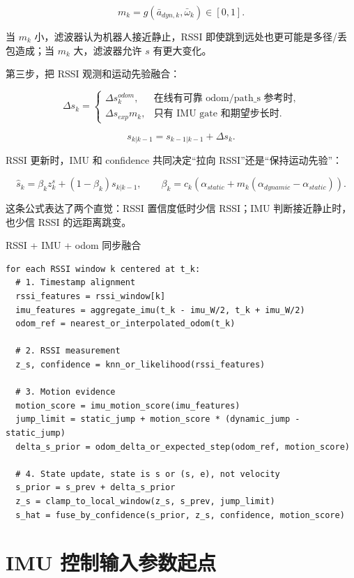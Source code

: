 \documentclass[11pt,a4paper,openany]{report}
\begin{document}
\[
  m_k = g(\bar{a}_{dyn,k}, \bar{\omega}_k) \in [0,1].
\]

当 \(m_k\) 小，滤波器认为机器人接近静止，RSSI 即使跳到远处也更可能是多径/丢包造成；当 \(m_k\) 大，滤波器允许 \(s\) 有更大变化。

第三步，把 RSSI 观测和运动先验融合：

\[
  \Delta s_k
  =
  \begin{cases}
    \Delta s_k^{odom}, & \text{在线有可靠 odom/path\_s 参考时},\\
    \Delta s_{exp} m_k, & \text{只有 IMU gate 和期望步长时}.
  \end{cases}
\]

\[
  s_{k|k-1} = s_{k-1|k-1} + \Delta s_k.
\]

RSSI 更新时，IMU 和 confidence 共同决定“拉向 RSSI”还是“保持运动先验”：

\[
  \hat{s}_k
  =
  \beta_k z_k^s
  +(1-\beta_k)s_{k|k-1},
  \qquad
  \beta_k = c_k(\alpha_{static}+m_k(\alpha_{dynamic}-\alpha_{static})).
\]

这条公式表达了两个直觉：RSSI 置信度低时少信 RSSI；IMU 判断接近静止时，也少信 RSSI 的远距离跳变。

\begin{algobox}{RSSI + IMU + odom 同步融合}
\begin{lstlisting}
for each RSSI window k centered at t_k:
  # 1. Timestamp alignment
  rssi_features = rssi_window[k]
  imu_features = aggregate_imu(t_k - imu_W/2, t_k + imu_W/2)
  odom_ref = nearest_or_interpolated_odom(t_k)

  # 2. RSSI measurement
  z_s, confidence = knn_or_likelihood(rssi_features)

  # 3. Motion evidence
  motion_score = imu_motion_score(imu_features)
  jump_limit = static_jump + motion_score * (dynamic_jump - static_jump)
  delta_s_prior = odom_delta_or_expected_step(odom_ref, motion_score)

  # 4. State update, state is s or (s, e), not velocity
  s_prior = s_prev + delta_s_prior
  z_s = clamp_to_local_window(z_s, s_prev, jump_limit)
  s_hat = fuse_by_confidence(s_prior, z_s, confidence, motion_score)
\end{lstlisting}
\end{algobox}

\section{IMU 控制输入参数起点}
\end{document}
